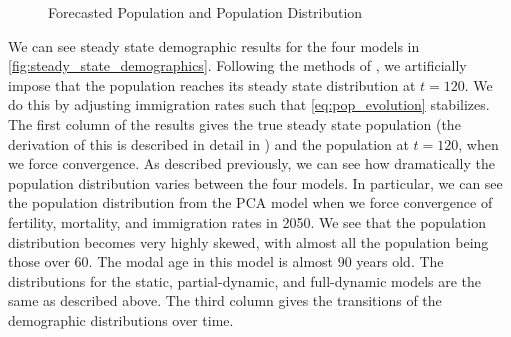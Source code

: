 \documentclass[10pt]{article}
\renewcommand{\thesection}{\arabic{section}}
\renewcommand{\thesubsection}{\thesection.\arabic{subsection}}
\renewcommand{\thesubsubsection}{\thesubsection.\arabic{subsubsection}}
\renewcommand{\subsubsection}[2][]{\oldsubsubsection[#1]{#2}\index{#1}\label{sec:\thesubsubsection}}
\numberwithin{equation}{subsection}
\newcommand*{\FigureDir}{../../graphs}
\begin{document}
\begin{figure}[!ht]
   \centering
   \caption{\label{fig:\thesubsubsection.3}Forecasted Population and Population Distribution}
\end{figure}


\subsubsection{Steady State}

\par We can see steady state demographic results for the four models in \autoref{fig:steady_state_demographics}. Following the methods of \cite{DE2018}, we artificially impose that the population reaches its steady state distribution at \(t=120\). We do this by adjusting immigration rates such that \ref{eq:pop_evolution} stabilizes. The first column of the results gives the true steady state population (the derivation of this is described in detail in \cite{DE2018}) and the population at \(t=120\), when we force convergence. As described previously, we can see how dramatically the population distribution varies between the four models. In particular, we can see the population distribution from the PCA model when we force convergence of fertility, mortality, and immigration rates in 2050. We see that the population distribution becomes very highly skewed, with almost all the population being those over 60. The modal age in this model is almost 90 years old. The distributions for the static, partial-dynamic, and full-dynamic models are the same as described above. The third column gives the transitions of the demographic distributions over time.
\end{document}
